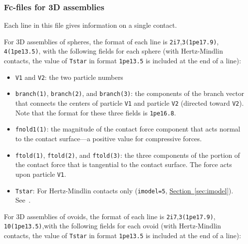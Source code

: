 \documentclass[letterpaper,11pt]{article}
\begin{document}
\subsubsection{Fc-files for 3D assemblies}\label{sec:f3files3d}
Each line in this file gives information on a single contact.
\par
For 3D assemblies of spheres,
the format of each line is \texttt{2i7},\texttt{3(1pe17.9)},
\texttt{4(1pe13.5)}, with
the following fields for each sphere
(with Hertz-Mindlin contacts, the value of \texttt{Tstar} in
format \texttt{1pe13.5} is included at the end of a line):
\begin{itemize}
\item
\texttt{V1} and \texttt{V2}:
the two particle numbers
\item
\texttt{branch(1)}, \texttt{branch(2)}, and \texttt{branch(3)}:
the components of the branch vector that
connects the centers of particle \texttt{V1} and particle \texttt{V2}
(directed toward \texttt{V2}).  Note that the format for these three fields
is \texttt{1pe16.8}.
\item
\texttt{fnold1(1)}:
the magnitude of the contact force 
component that acts normal to the contact surface---a
positive value for compressive forces.
\item
\texttt{ftold(1)}, \texttt{ftold(2)}, and \texttt{ftold(3)}:
the three components of the portion of the contact force
that is tangential to the contact surface.
The force acts upon particle \texttt{V1}.
\item
\texttt{Tstar}:
For Hertz-Mindlin contacts only (\texttt{imodel=5},
\hyperref[sec:imodel]{Section~\ref*{sec:imodel}}).
See~\citep{Thornton:1988a}.
\end{itemize}
%
\par
For 3D assemblies of ovoids,
the format of each line is \texttt{2i7},\texttt{3(1pe17.9)},
\texttt{10(1pe13.5)},with
the following fields
for each ovoid
(with Hertz-Mindlin contacts, the value of \texttt{Tstar} in
format \texttt{1pe13.5} is included at the end of a line):
\end{document}
